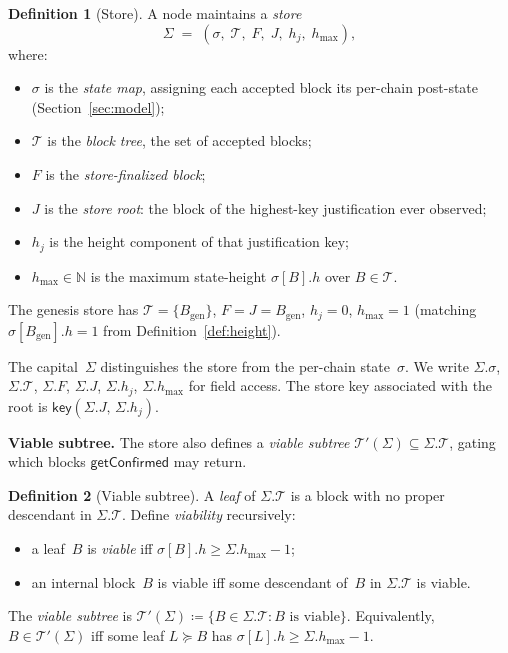 \ifx\litemode\undefined\documentclass{article}\fi
\newcommand{\genesis}{\ensuremath{B_{\mathrm{gen}}}}
\newcommand{\T}[0]{\ensuremath{\mathcal{T}}}
\newcommand{\hmax}{\ensuremath{h_{\max}}\xspace}
\newcommand{\viableTree}{\ensuremath{\mathcal{T}'}}
\newcommand{\getConfirmed}{\textsf{getConfirmed}\xspace}
\newcommand{\key}{\ensuremath{\mathsf{key}}}
\renewcommand{\paragraph}[1]{\vspace{7pt}\noindent\textbf{#1}}
\theoremstyle{plain}
\theoremstyle{definition}
\newtheorem{definition}{Definition}
\theoremstyle{remark}
\begin{document}
\begin{definition}[Store]\label{def:store}
A node maintains a \emph{store}
\[
  \Sigma \;=\; (\sigma,\; \T,\; F,\; J,\; h_j,\; \hmax),
\]
where:
\begin{itemize}
  \item $\sigma$ is the \emph{state map}, assigning each accepted block its per-chain post-state (Section~\ref{sec:model});
  \item $\T$ is the \emph{block tree}, the set of accepted blocks;
  \item $F$ is the \emph{store-finalized block};
  \item $J$ is the \emph{store root}: the block of the highest-key justification ever observed;
  \item $h_j$ is the height component of that justification key;
  \item $\hmax \in \mathbb{N}$ is the maximum state-height $\sigma[B].h$ over $B \in \T$.
\end{itemize}
The genesis store has $\T = \{\genesis\}$, $F = J = \genesis$, $h_j = 0$, $\hmax = 1$ (matching $\sigma[\genesis].h = 1$ from Definition~\ref{def:height}).
\end{definition}

The capital~$\Sigma$ distinguishes the store from the per-chain state~$\sigma$.
We write $\Sigma.\sigma$, $\Sigma.\T$, $\Sigma.F$, $\Sigma.J$, $\Sigma.h_j$, $\Sigma.\hmax$ for field access.
The store key associated with the root is $\key(\Sigma.J,\, \Sigma.h_j)$.

\paragraph{Viable subtree.}
The store also defines a \emph{viable subtree} $\viableTree(\Sigma) \subseteq \Sigma.\T$, gating which blocks $\getConfirmed$ may return.

\begin{definition}[Viable subtree]\label{def:viable}
A \emph{leaf} of $\Sigma.\T$ is a block with no proper descendant in $\Sigma.\T$.
Define \emph{viability} recursively:
\begin{itemize}
  \item a leaf~$B$ is \emph{viable} iff $\sigma[B].h \geq \Sigma.\hmax - 1$;
  \item an internal block~$B$ is viable iff some descendant of~$B$ in $\Sigma.\T$ is viable.
\end{itemize}
The \emph{viable subtree} is $\viableTree(\Sigma) \coloneqq \{B \in \Sigma.\T : B \text{ is viable}\}$.
Equivalently, $B \in \viableTree(\Sigma)$ iff some leaf $L \succeq B$ has $\sigma[L].h \geq \Sigma.\hmax - 1$.
\end{definition}
\end{document}
